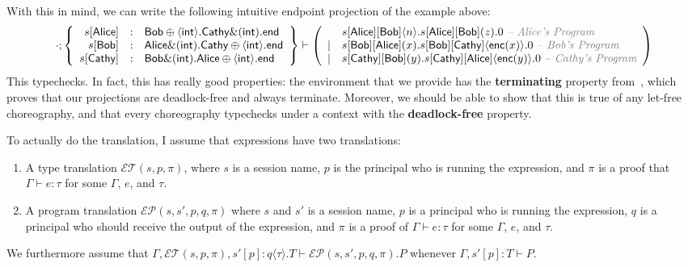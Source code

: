 \documentclass{article}
\theoremstyle{definition}
\newcommand{\proves}{\vdash}
\begin{document}
With this in mind, we can write the following intuitive endpoint projection of the example above:
$$
\cdot; \left\{
  \begin{array}{rcl}
    s[\textsf{Alice}] & : & \textsf{Bob}\oplus\langle \textsf{int}\rangle. \textsf{Cathy}\&(\textsf{int}). \textsf{end}\\
    s[\textsf{Bob}]   & : & \textsf{Alice}\&(\textsf{int}). \textsf{Cathy}\oplus\langle \textsf{int}\rangle. \textsf{end}\\
    s[\textsf{Cathy}] & : & \textsf{Bob}\&(\textsf{int}). \textsf{Alice}\oplus\langle \textsf{int}\rangle. \textsf{end}\\
  \end{array}\right\}
\proves
\left(
  \begin{array}{ll}
      & s[\textsf{Alice}][\textsf{Bob}]\langle n\rangle. s[\textsf{Alice}][\textsf{Bob}](z).0~\textcolor{gray}{\textit{-- Alice's Program}}\\
    | & s[\textsf{Bob}][\textsf{Alice}](x). s[\textsf{Bob}][\textsf{Cathy}]\langle \textsf{enc}(x)\rangle. 0~\textcolor{gray}{\textit{-- Bob's Program}}\\
    | & s[\textsf{Cathy}][\textsf{Bob}](y). s[\textsf{Cathy}][\textsf{Alice}]\langle \textsf{enc}(y)\rangle.0~\textcolor{gray}{\textit{-- Cathy's Program}}\\
  \end{array}
\right)
$$
This typechecks.
In fact, this has really good properties: the environment that we provide has the \textbf{terminating} property from~\citet{ScalasY19}, which proves that our projections are deadlock-free and always terminate.
Moreover, we should be able to show that this is true of any \textsf{let}-free choreography, and that every choreography typechecks under a context with the \textbf{deadlock-free} property.

\newcommand{\ET}{\mathcal{E}\mathcal{T}}
\newcommand{\EP}{\mathcal{E}\mathcal{P}}
\newcommand{\CT}{\mathcal{C}\mathcal{T}}
\newcommand{\CP}{\mathcal{C}\mathcal{P}}
To actually do the translation, I assume that expressions have two translations:
\begin{enumerate}
\item A type translation $\ET(s, p, \pi)$, where $s$ is a session name, $p$ is the principal who is running the expression, and $\pi$ is a proof that $\Gamma \proves e : \tau$ for some $\Gamma$, $e$, and $\tau$.
\item A program translation $\EP(s, s', p, q, \pi)$ where $s$ and $s'$ is a session name, $p$ is a principal who is running the expression, $q$ is a principal who should receive the output of the expression, and $\pi$ is a proof of $\Gamma \proves e : \tau$ for some $\Gamma$, $e$, and $\tau$.
\end{enumerate}
We furthermore assume that $\Gamma, \ET(s,p,\pi), s'[p] : q\langle \tau \rangle.T \proves \EP(s,s',p,q,\pi).P$ whenever $\Gamma, s'[p] : T \proves P$.
\end{document}
